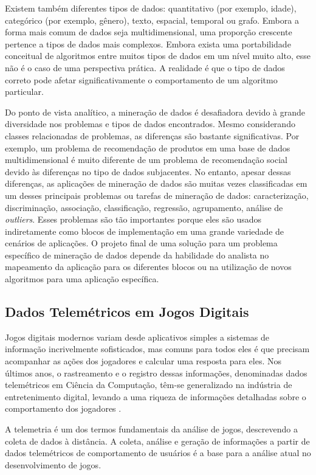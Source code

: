 Existem também diferentes tipos de dados: quantitativo (por exemplo, idade), categórico (por exemplo, gênero), texto, espacial, temporal ou grafo. Embora a forma mais comum de dados seja multidimensional, uma proporção crescente pertence a tipos de dados mais complexos. Embora exista uma portabilidade conceitual de algoritmos entre muitos tipos de dados em um nível muito alto, esse não é o caso de uma perspectiva prática. A realidade é que o tipo de dados correto pode afetar significativamente o comportamento de um algoritmo particular.

Do ponto de vista analítico, a mineração de dados é desafiadora devido à grande diversidade nos problemas e tipos de dados encontrados. Mesmo considerando classes relacionadas de problemas, as diferenças são bastante significativas. Por exemplo, um problema de recomendação de produtos em uma base de dados multidimensional é muito diferente de um problema de recomendação social devido às diferenças no tipo de dados subjacentes. No entanto, apesar dessas diferenças, as aplicações de mineração de dados são muitas vezes classificadas em um desses principais problemas ou tarefas de mineração de dados: caracterização, discriminação, associação, classificação, regressão, agrupamento, análise de \textit{outliers}. Esses problemas são tão importantes porque eles são usados indiretamente como blocos de implementação em uma grande variedade de cenários de aplicações. O projeto final de uma solução para um problema específico de mineração de dados depende da habilidade do analista no mapeamento da aplicação para os diferentes blocos ou na utilização de novos algoritmos para uma aplicação específica.

\subsection{Dados Telemétricos em Jogos Digitais}
Jogos digitais modernos variam desde aplicativos simples a sistemas de informação incrivelmente sofisticados, mas comuns para todos eles é que precisam acompanhar as ações dos jogadores e calcular uma resposta para eles. Nos últimos anos, o rastreamento e o registro dessas informações, denominadas dados telemétricos em Ciência da Computação, têm-se generalizado na indústria de entretenimento digital, levando a uma riqueza de informações detalhadas sobre o comportamento dos jogadores \cite{el2016game}.

A telemetria é um dos termos fundamentais da análise de jogos, descrevendo a coleta de dados à distância. A coleta, análise e geração de informações a partir de dados telemétricos de comportamento de usuários é a base para a análise atual no desenvolvimento de jogos.


